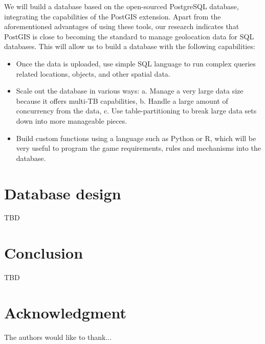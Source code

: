 \documentclass[conference]{IEEEtran}
\begin{document}
We will build a database based on the open-sourced PostgreSQL database, integrating the capabilities of the PostGIS extension. Apart from the aforementioned advantages of using these tools, our research indicates that PostGIS is close to becoming the standard to manage geolocation data for SQL databases.  This will allow us to build a database with the following capabilities:
\begin{itemize}
\item	Once the data is uploaded, use simple SQL language to run complex queries related locations, objects, and other spatial data. 
\item Scale out the database in various ways: a. Manage a very large data size because it offers multi-TB capabilities, b. Handle a large amount of concurrency from the data, c. Use table-partitioning to break large data sets down into more manageable pieces.
\item Build custom functions using a language such as Python or R, which will be very useful to program the game requirements, rules and mechanisms into the database. 
\end{itemize}

\section{Database design}
TBD
\section{Conclusion}
TBD

\section*{Acknowledgment}


The authors would like to thank...
\end{document}
